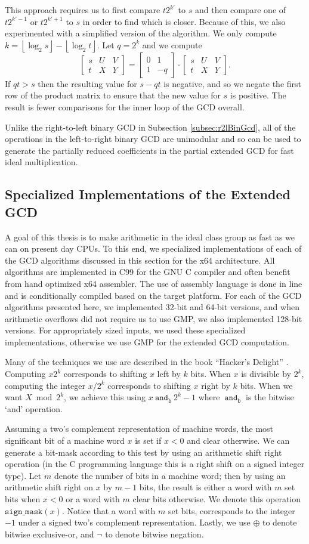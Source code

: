\documentclass{ucalgthes1}
\theoremstyle{definition}
\newcommand{\matrixtt}[4]{\left[ \begin{array}{rr} #1 & #2 \\ #3 & #4 \end{array} \right]}
\newcommand{\matrixThreeTwo}[6]{\left[ \begin{array}{rrr} #1 & #2 & #3 \\ #4 & #5 & #6 \end{array} \right]}
\newcommand{\floor}[1]{\left\lfloor #1 \right\rfloor}
\newcommand{\band}{~\texttt{and}_\texttt{b}~}
\begin{document}
This approach requires us to first compare $t2^{k'}$ to $s$ and then compare one of $t2^{k'-1}$ or $t2^{k'+1}$ to $s$ in order to find which is closer.  Because of this, we also experimented with a simplified version of the algorithm.  We only compute $k = \floor{\log_2s}-\floor{\log_2t}$.  Let $q=2^k$ and we compute
\[
	\matrixThreeTwo{s}{U}{V}{t}{X}{Y} =
		\matrixtt{0}{1}{1}{-q} \cdot \matrixThreeTwo{s}{U}{V}{t}{X}{Y}.
\]
If $qt > s$ then the resulting value for $s-qt$ is negative, and so we negate the first row of the product matrix to ensure that the new value for $s$ is positive.  The result is fewer comparisons for the inner loop of the GCD overall.

Unlike the right-to-left binary GCD in Subsection \ref{subsec:r2lBinGcd}, all of the operations in the left-to-right binary GCD are unimodular and so can be used to generate the partially reduced coefficients in the partial extended GCD for fast ideal multiplication.


\subsection{Specialized Implementations of the Extended GCD}
\label{subsec:gcdImpl}

A goal of this thesis is to make arithmetic in the ideal class group as fast as we can on present day CPUs. To this end, we specialized implementations of each of the GCD algorithms discussed in this section for the x64 architecture.  All algorithms are implemented in C99 for the GNU C compiler and often benefit from hand optimized x64 assembler.  The use of assembly language is done in line and is conditionally compiled based on the target platform.  For each of the GCD algorithms presented here, we implemented 32-bit and 64-bit versions, and when arithmetic overflows did not require us to use GMP, we also implemented 128-bit versions.  For appropriately sized inputs, we used these specialized implementations, otherwise we use GMP for the extended GCD computation.

Many of the techniques we use are described in the book ``Hacker's Delight'' \cite{Warren2002}.  Computing $x2^k$ corresponds to shifting $x$ left by $k$ bits.  When $x$ is divisible by $2^k$, computing the integer $x / 2^k$ corresponds to shifting $x$ right by $k$ bits.  When we want $X \bmod 2^k$, we achieve this using $x \band 2^k-1$ where $\band$ is the bitwise `and' operation.  

Assuming a two's complement representation of machine words, the most significant bit of a machine word $x$ is set if $x < 0$ and clear otherwise.  We can generate a bit-mask according to this test by using an arithmetic shift right operation (in the C programming language this is a right shift on a signed integer type).  Let $m$ denote the number of bits in a machine word; then by using an arithmetic shift right on $x$ by $m-1$ bits, the result is either a word with $m$ set bits when $x < 0$ or a word with $m$ clear bits otherwise.  We denote this operation $\texttt{sign\_mask}(x)$.  Notice that a word with $m$ set bits, corresponds to the integer $-1$ under a signed two's complement representation.  Lastly, we use $\oplus$ to denote bitwise exclusive-or, and $\lnot$ to denote bitwise negation.
\end{document}
